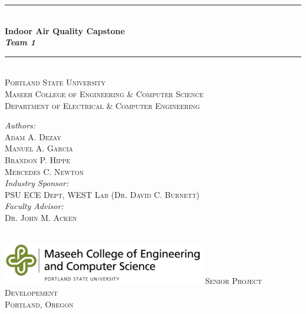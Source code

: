 \documentclass[hidelinks, 12pt]{article} %
\begin{document}
\pagestyle{fancy}

\begin{titlepage}
\newcommand{\HRule}{\rule{\linewidth}{0.5mm}} %
\center %

\HRule \\[0.4cm]
{ \huge \color{PSUgreen}\bfseries Indoor Air Quality Capstone \\[0.4cm] \Large \emph{Team 1}}\\[0.4cm] %
\HRule \\[0.5cm]

\textsc{\large Portland State University \\ Maseeh College of Engineering \& Computer Science \\ Department of Electrical \& Computer Engineering}\\[1.0cm]

\begin{minipage}{0.5\textwidth}
\large
\emph{Authors:}\\
\textsc{Adam A. Dezay}\\ 
\textsc{Manuel A. Garcia}\\ 
\textsc{Brandon P. Hippe}\\ 
\textsc{Mercedes C. Newton}\\ 
\emph{Industry Sponsor:}\\
\textsc{PSU ECE Dept, WEST Lab (Dr. David C. Burnett)}\\ 
\emph{Faculty Advisor:}\\
\textsc{Dr. John M. Acken}\\ 
\end{minipage}\\[0.5cm]
\vfill %
\includegraphics[width=3.5in]{psuMCECSlogo_horiz.png}
\vfill
\textsc{\color{PSUgray}\normalsize Senior Project Developement \\ Portland, Oregon}\\[0.5cm] %

\end{titlepage}
\end{document}
